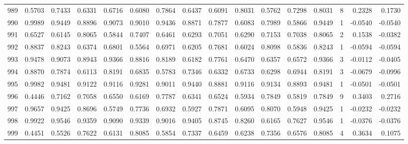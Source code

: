 \begin{tabular}{lrrrrrrrrrrrrrrr}
989 &      0.5703 &  0.7433 &  0.6331 &  0.6716 &  0.6080 &  0.7864 &  0.6437 &  0.6091 &  0.8031 &  0.5762 &   0.7298 &     0.8031 &      8 &                    0.2328 &                     0.1730 \\
990 &      0.9989 &  0.9449 &  0.8896 &  0.9073 &  0.9010 &  0.9436 &  0.8871 &  0.7877 &  0.6083 &  0.7989 &   0.5866 &     0.9449 &      1 &                   -0.0540 &                    -0.0540 \\
991 &      0.6527 &  0.6145 &  0.8065 &  0.5844 &  0.7407 &  0.6461 &  0.6293 &  0.7051 &  0.6290 &  0.7153 &   0.7038 &     0.8065 &      2 &                    0.1538 &                    -0.0382 \\
992 &      0.8837 &  0.8243 &  0.6374 &  0.6801 &  0.5564 &  0.6971 &  0.6205 &  0.7681 &  0.6024 &  0.8098 &   0.5836 &     0.8243 &      1 &                   -0.0594 &                    -0.0594 \\
993 &      0.9478 &  0.9073 &  0.8943 &  0.9366 &  0.8816 &  0.8189 &  0.6182 &  0.7761 &  0.6470 &  0.6357 &   0.6572 &     0.9366 &      3 &                   -0.0112 &                    -0.0405 \\
994 &      0.8870 &  0.7874 &  0.6113 &  0.8191 &  0.6835 &  0.5783 &  0.7346 &  0.6332 &  0.6733 &  0.6298 &   0.6944 &     0.8191 &      3 &                   -0.0679 &                    -0.0996 \\
995 &      0.9982 &  0.9481 &  0.9122 &  0.9116 &  0.9281 &  0.9011 &  0.9440 &  0.8881 &  0.9116 &  0.9134 &   0.8893 &     0.9481 &      1 &                   -0.0501 &                    -0.0501 \\
996 &      0.4446 &  0.7162 &  0.7058 &  0.6550 &  0.6169 &  0.7787 &  0.6341 &  0.6524 &  0.5934 &  0.7849 &   0.5819 &     0.7849 &      9 &                    0.3403 &                     0.2716 \\
997 &      0.9657 &  0.9425 &  0.8696 &  0.5749 &  0.7736 &  0.6932 &  0.5927 &  0.7871 &  0.6095 &  0.8070 &   0.5948 &     0.9425 &      1 &                   -0.0232 &                    -0.0232 \\
998 &      0.9922 &  0.9546 &  0.9359 &  0.9090 &  0.9339 &  0.9016 &  0.9405 &  0.8745 &  0.8260 &  0.6165 &   0.7627 &     0.9546 &      1 &                   -0.0376 &                    -0.0376 \\
999 &      0.4451 &  0.5526 &  0.7622 &  0.6131 &  0.8085 &  0.5854 &  0.7337 &  0.6459 &  0.6238 &  0.7356 &   0.6576 &     0.8085 &      4 &                    0.3634 &                     0.1075 \\
\bottomrule
\end{tabular}
